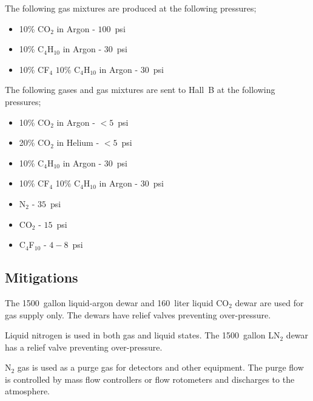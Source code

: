 The following gas mixtures are produced at the following pressures;

\begin{itemize}
\item 10\% CO$_2$ in Argon - $100$~psi
\item 10\% C$_4$H$_{10}$ in Argon - $30$~psi
\item 10\% CF$_4$ $10\%$ C$_4$H$_{10}$ in Argon - $30$~psi
\end{itemize}

%

The following gases and gas mixtures are sent to Hall~B at the following pressures;

\begin{itemize}
\item 10\% CO$_2$ in Argon - $<5$~psi
\item 20\% CO$_2$ in Helium - $<5$~psi
\item 10\% C$_4$H$_{10}$ in Argon - $30$~psi
\item 10\% CF$_4$ 10\% C$_4$H$_{10}$ in Argon - $30$~psi
\item N$_2$ - $35$~psi
\item CO$_2$ - $15$~psi
\item C$_4$F$_{10}$ - $4 - 8$~psi
\end{itemize}

\subsection{Mitigations}

The 1500~gallon liquid-argon dewar and 160~liter liquid CO$_2$ dewar are used for gas supply 
only. The dewars have relief valves preventing over-pressure.

Liquid nitrogen is used in both gas and liquid states. The 1500~gallon LN$_2$ dewar has a 
relief valve preventing over-pressure. 

N$_2$ gas is used as a purge gas for detectors and other equipment. The purge flow is 
controlled by mass flow controllers or flow rotometers and discharges to the atmosphere.

